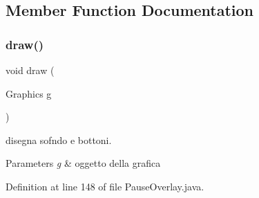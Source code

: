 \subsection{Member Function Documentation}
\mbox{\label{classui_1_1_pause_overlay_a72fe1ffca978e99fd16994a10e7f8051}} 
\subsubsection{\texorpdfstring{draw()}{draw()}}
{\footnotesize\ttfamily void draw (\begin{DoxyParamCaption}\item[{Graphics}]{g }\end{DoxyParamCaption})}



disegna sofndo e bottoni. 


\begin{DoxyParams}{Parameters}
{\em g} & oggetto della grafica \\
\hline
\end{DoxyParams}


Definition at line 148 of file Pause\+Overlay.\+java.

